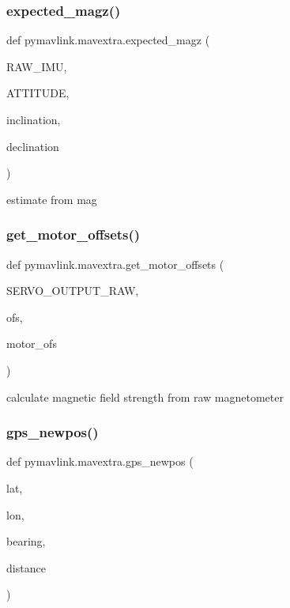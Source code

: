 \subsubsection{\texorpdfstring{expected\+\_\+magz()}{expected\_magz()}}
{\footnotesize\ttfamily def pymavlink.\+mavextra.\+expected\+\_\+magz (\begin{DoxyParamCaption}\item[{}]{R\+A\+W\+\_\+\+I\+MU,  }\item[{}]{A\+T\+T\+I\+T\+U\+DE,  }\item[{}]{inclination,  }\item[{}]{declination }\end{DoxyParamCaption})}

\begin{DoxyVerb}estimate  from mag\end{DoxyVerb}
 \mbox{\label{namespacepymavlink_1_1mavextra_a5c02a6aebf8c43eef46c2aad3b75623a}} 
\subsubsection{\texorpdfstring{get\+\_\+motor\+\_\+offsets()}{get\_motor\_offsets()}}
{\footnotesize\ttfamily def pymavlink.\+mavextra.\+get\+\_\+motor\+\_\+offsets (\begin{DoxyParamCaption}\item[{}]{S\+E\+R\+V\+O\+\_\+\+O\+U\+T\+P\+U\+T\+\_\+\+R\+AW,  }\item[{}]{ofs,  }\item[{}]{motor\+\_\+ofs }\end{DoxyParamCaption})}

\begin{DoxyVerb}calculate magnetic field strength from raw magnetometer\end{DoxyVerb}
 \mbox{\label{namespacepymavlink_1_1mavextra_addedb30f8a88b98176fe226bfed8aaad}} 
\subsubsection{\texorpdfstring{gps\+\_\+newpos()}{gps\_newpos()}}
{\footnotesize\ttfamily def pymavlink.\+mavextra.\+gps\+\_\+newpos (\begin{DoxyParamCaption}\item[{}]{lat,  }\item[{}]{lon,  }\item[{}]{bearing,  }\item[{}]{distance }\end{DoxyParamCaption})}

